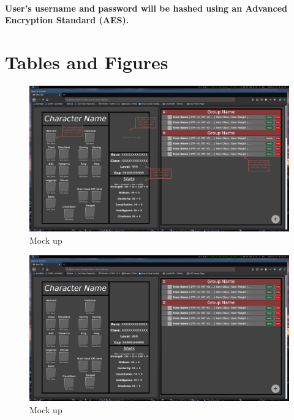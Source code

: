 \documentclass[12pt,letterpaper]{article}
\begin{document}
			\paragraph{\indent User's username and password will be hashed using an Advanced Encryption Standard (AES). \\}

			
	\clearpage

	\section{Tables and Figures}
	\begin{figure}[hbt]
		\includegraphics[width=\linewidth]{Second_Mockup_Anotated.png}		
		\caption{Mock up}
		\label{fig:markedUpMockup}
	\end{figure}

	\begin{figure}[hbt]
		\includegraphics[width=\linewidth]{Second_Mockup.png}		
		\caption{Mock up}
		\label{fig:mockup}
	\end{figure}
\end{document}
